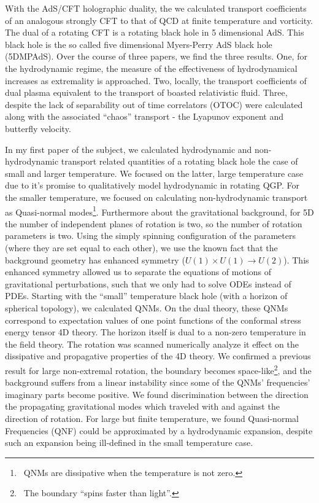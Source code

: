 \documentclass[12pt]{article}
\begin{document}
With the AdS/CFT holographic duality, the we calculated transport coefficients of an analogous strongly CFT to that of QCD at finite temperature and vorticity.
%
The dual of a rotating CFT is a rotating black hole in 5 dimensional AdS. 
%
This black hole is the so called five dimensional Myers-Perry AdS black hole (5DMPAdS).
%
Over the course of three papers, we find the three results. 
%
One, for the hydrodynamic regime, the measure of the effectiveness of hydrodynamical increases as extremality is approached.
%
Two, locally, the transport coefficients of dual plasma equivalent to the transport of boasted relativistic fluid.
%
Three, despite the lack of separability out of time correlators (OTOC) were calculated along with the associated ``chaos'' transport - the Lyapunov exponent and butterfly velocity.
%

In my first paper of the subject, we calculated hydrodynamic and non-hydrodynamic transport related quantities of a rotating black hole the case of small and larger temperature.
%
We focused on the latter, large temperature case due to it's promise to qualitatively model hydrodynamic in rotating QGP.
%
For the smaller temperature, we focused on calculating non-hydrodynamic transport as Quasi-normal modes\footnote{\
  QNMs are dissipative when the temperature is not zero.
}.
%
Furthermore about the gravitational background, for 5D the number of independent planes of rotation is two, so the number of rotation parameters is two.
%
Using the simply spinning configuration of the parameters (where they are set equal to each other), we use the known fact that the background geometry has enhanced symmetry ($U(1)\times U(1) \rightarrow U(2)$).
%
This enhanced symmetry allowed us to separate the equations of motions of gravitational perturbations, such that we only had to solve ODEs instead of PDEs.
%
Starting with the ``small'' temperature black hole (with a horizon of spherical topology), we calculated QNMs.
%
On the dual theory, these QNMs correspond to expectation values of one point functions of the conformal stress energy tensor 4D theory.
%
The horizon itself is dual to a non-zero temperature in the field theory.
%
The rotation was scanned numerically analyze it effect on the dissipative and propagative properties of the 4D theory.
%
We confirmed a previous result for large non-extremal rotation, the boundary becomes space-like\footnote{\
  The boundary ``spins faster than light''.
}, and the background suffers from a linear instability since some of the QNMs' frequencies' imaginary parts become positive.
%
We found discrimination between the direction the propagating gravitational modes which traveled with and against the direction of rotation.
%
For large but finite temperature, we found Quasi-normal Frequencies (QNF) could be approximated by a hydrodynamic expansion, despite such an expansion being ill-defined in the small temperature case.
\end{document}
